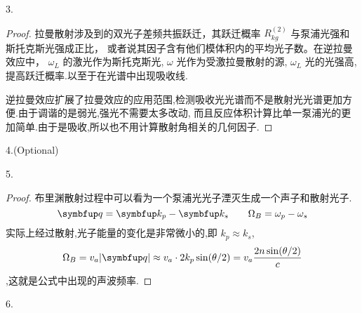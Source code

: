 \begin{exercise}
    3.
\end{exercise}

\begin{proof}
    拉曼散射涉及到的双光子差频共振跃迁，其跃迁概率 $R_{kg}^{(2)}$ 与泵浦光强和斯托克斯光强成正比，
    或者说其因子含有他们模体积内的平均光子数。在逆拉曼效应中， $\omega_L$ 的激光作为斯托克斯光,
    $\omega$ 光作为受激拉曼散射的源, $\omega_L$ 光的光强高,提高跃迁概率.以至于在光谱中出现吸收线.
    
    逆拉曼效应扩展了拉曼效应的应用范围,检测吸收光光谱而不是散射光光谱更加方便.由于调谐的是弱光,强光不需要太多改动,
    而且反应体积计算比单一泵浦光的更加简单.由于是吸收,所以也不用计算散射角相关的几何因子.
\end{proof}

\begin{exercise}
    4.(Optional)
\end{exercise}

\begin{exercise}
    5.
\end{exercise}

\begin{proof}
    布里渊散射过程中可以看为一个泵浦光光子湮灭生成一个声子和散射光子.
    $$\Vect{q}=\Vect{k_p}-\Vect{k_s} \qquad \Omega_B = \omega_p - \omega_s $$
    实际上经过散射,光子能量的变化是非常微小的,即 $k_p \approx k_s$,
    $$\Omega_B = v_a |\Vect{q}| \approx v_a \cdot 2 k_p \sin(\theta/2)
    = v_a \frac{2n \sin(\theta/2)}{c}$$,这就是公式中出现的声波频率.
\end{proof}

\begin{exercise}
    6.
\end{exercise}

